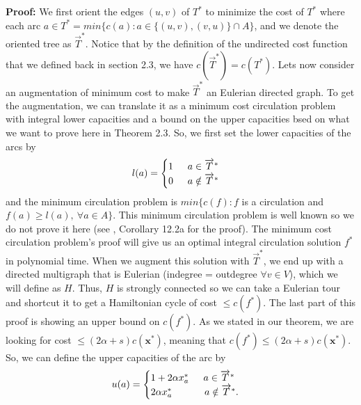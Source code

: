 \documentclass[oneside]{projectpaper} %
\begin{document}
\newline
\newline
\textbf{Proof:} We first orient the edges $(u, v)$ of $T^*$ to minimize the cost of $T^*$ where each arc $a \in T^* = min\{c(a) : a \in \{(u, v), (v, u)\} \cap A\}$, and we denote the oriented tree as $\overrightarrow{T}^*$. Notice that by the definition of the undirected cost function that we defined back in section 2.3, we have $c(\overrightarrow{T}^*) = c(T^*)$. \newline
\indent Lets now consider an augmentation of minimum cost to make $\overrightarrow{T}^*$ an Eulerian directed graph. To get the augmentation, we can translate it as a minimum cost circulation problem with integral lower capacities and a bound on the upper capacities bsed on what we want to prove here in Theorem 2.3. So, we first set the lower capacities of the arcs by 
\begin{equation*}
l(a) =
  \begin{cases}
    1 \indent a \in \overrightarrow{T}^* \\
    0 \indent a \notin \overrightarrow{T}^* \\
  \end{cases}
\end{equation*}
and the minimum circulation problem is $min\{c(f) : f$ is a circulation and $f(a) \geq l(a), \ \forall a \in A\}$. This minimum circulation problem is well known so we do not prove it here (see \cite{Sch03}, Corollary 12.2a for the proof). The minimum cost circulation problem's proof will give us an optimal integral circulation solution $f^*$ in polynomial time. When we augment this solution with $\overrightarrow{T}^*$, we end up with a directed multigraph that is Eulerian (indegree = outdegree $\forall v \in V$), which we will define as $H$. Thus, $H$ is strongly connected so we can take a Eulerian tour and shortcut it to get a Hamiltonian cycle of cost $\leq c(f^*)$. \newline
\indent The last part of this proof is showing an upper bound on $c(f^*)$. As we stated in our theorem, we are looking for cost $\leq (2\alpha + s)c(\textbf{x}^*)$, meaning that $c(f^*) \leq (2\alpha + s)c(\textbf{x}^*)$. So, we can define the upper capacities of the arc by
\begin{equation*}
u(a) =
  \begin{cases}
    1 + 2\alpha x_{a}^{*} \indent a \in \overrightarrow{T}^* \\
    2\alpha x_{a}^{*} \indent \indent \  a \notin \overrightarrow{T}^*. \\
  \end{cases}
\end{equation*}
\end{document}
